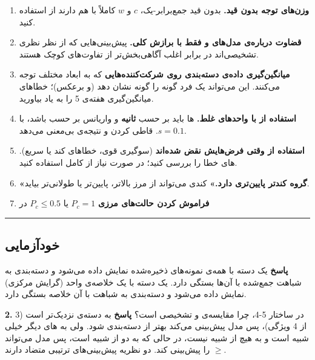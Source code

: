 \begin{enumerate}
\def\labelenumi{\arabic{enumi}.}
\tightlist
\item
  \textbf{وزن‌های توجه بدون قید.} بدون قید جمع‌برابر-یک، \(c\) و \(w\)
  کاملاً با هم  دارند  از
   استفاده کنید.
\item
  \textbf{قضاوت درباره‌ی مدل‌های  و  فقط با
  برازش کلی.} پیش‌بینی‌هایی که از نظر نظری تشخیصی‌اند  در برابر
   اغلب آگاهی‌بخش‌تر از تفاوت‌های کوچک  هستند.
\item
  \textbf{میانگین‌گیری داده‌ی دسته‌بندی روی شرکت‌کننده‌هایی} که به ابعاد
  مختلف توجه می‌کنند. این می‌تواند یک فرد گونه را
  گونه نشان دهد (و برعکس)؛ خطاهای میانگین‌گیری هفته‌ی 5 را
  به یاد بیاورید.
\item
  \textbf{استفاده از  با واحدهای غلط.} ها باید بر حسب
  \textbf{ثانیه} و واریانس بر حسب  باشد، با \(s = 0.1\). قاطی
  کردن  و  نتیجه‌ی بی‌معنی می‌دهد.
\item
  \textbf{استفاده از  وقتی فرض‌هایش نقض شده‌اند} (سوگیری قوی،
  خطاهای کند یا سریع). های خطا را بررسی کنید؛ در صورت نیاز از
   کامل استفاده کنید.
\item
  \textbf{«گروه کندتر  پایین‌تری دارد.»} کندی می‌تواند از
  مرز بالاتر،  پایین‌تر یا  طولانی‌تر
  بیاید.
\item
  \textbf{فراموش کردن حالت‌های مرزی} \(P_c = 1\) یا \(P_c \le 0.5\) در
\end{enumerate}

\begin{center}\rule{0.5\linewidth}{0.5pt}\end{center}

\subsection{خودآزمایی}

\textbf{پاسخ}  یک دسته با همه‌ی نمونه‌های ذخیره‌شده نمایش
داده می‌شود و دسته‌بندی به شباهت جمع‌شده با آن‌ها بستگی دارد.
 یک دسته با یک خلاصه‌ی واحد (گرایش مرکزی) نمایش داده می‌شود
و دسته‌بندی به شباهت با آن خلاصه بستگی دارد.

\textbf{2.} در ساختار 5-4، چرا مقایسه‌ی  و  تشخیصی است؟
\textbf{پاسخ}  به  دسته‌ی  نزدیک‌تر است (3 از 4
ویژگی)، پس مدل  پیش‌بینی می‌کند بهتر از  دسته‌بندی
شود. ولی  به های دیگر  خیلی شبیه است و به هیچ
 از  شبیه نیست، در حالی که  به دو
 از  شبیه است، پس مدل  می‌تواند  \ensuremath{\geq}
 را پیش‌بینی کند. دو نظریه پیش‌بینی‌های ترتیبی متضاد دارند.

